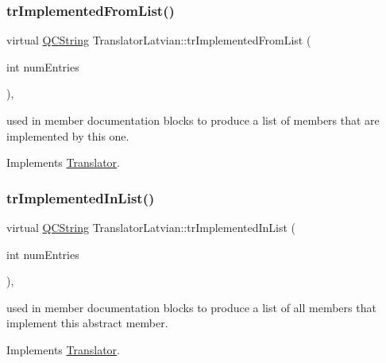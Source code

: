 \mbox{\label{class_translator_latvian_ada6f3c12a3fff42231971fb2452cdb5d}} 
\subsubsection{\texorpdfstring{trImplementedFromList()}{trImplementedFromList()}}
{\footnotesize\ttfamily virtual \mbox{\hyperlink{class_q_c_string}{Q\+C\+String}} Translator\+Latvian\+::tr\+Implemented\+From\+List (\begin{DoxyParamCaption}\item[{int}]{num\+Entries }\end{DoxyParamCaption})\hspace{0.3cm}{\ttfamily [inline]}, {\ttfamily [virtual]}}

used in member documentation blocks to produce a list of members that are implemented by this one. 

Implements \mbox{\hyperlink{class_translator}{Translator}}.

\mbox{\label{class_translator_latvian_ad65d7884e953950b2cffc847a8b5dc90}} 
\subsubsection{\texorpdfstring{trImplementedInList()}{trImplementedInList()}}
{\footnotesize\ttfamily virtual \mbox{\hyperlink{class_q_c_string}{Q\+C\+String}} Translator\+Latvian\+::tr\+Implemented\+In\+List (\begin{DoxyParamCaption}\item[{int}]{num\+Entries }\end{DoxyParamCaption})\hspace{0.3cm}{\ttfamily [inline]}, {\ttfamily [virtual]}}

used in member documentation blocks to produce a list of all members that implement this abstract member. 

Implements \mbox{\hyperlink{class_translator}{Translator}}.

\mbox{\label{class_translator_latvian_a8f96a72edc057c1ceed30106239fcdf0}} 
